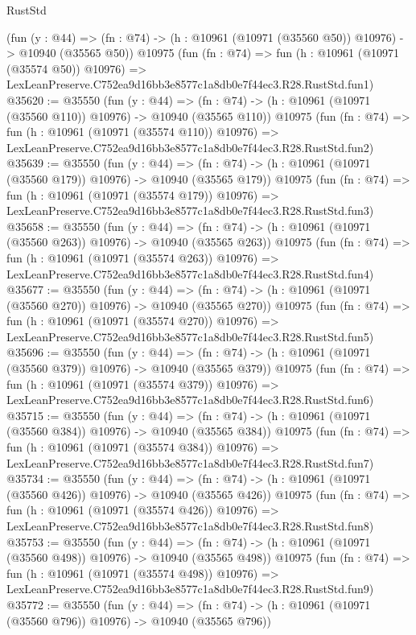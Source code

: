 \begin{lexlean}{RustStd}
\begin{coremodule}
    (fun (y : @44) =>
    (fn : @74) -> (h : @10961 (@10971 (@35560 @50)) @10976) -> @10940 (@35565 @50))
    @10975
    (fun (fn : @74) =>
    fun (h : @10961 (@10971 (@35574 @50)) @10976) =>
    LexLeanPreserve.C752ea9d16bb3e8577c1a8db0e7f44ec3.R28.RustStd.fun1)
@35620 := @35550
    (fun (y : @44) =>
    (fn : @74) -> (h : @10961 (@10971 (@35560 @110)) @10976) -> @10940 (@35565 @110))
    @10975
    (fun (fn : @74) =>
    fun (h : @10961 (@10971 (@35574 @110)) @10976) =>
    LexLeanPreserve.C752ea9d16bb3e8577c1a8db0e7f44ec3.R28.RustStd.fun2)
@35639 := @35550
    (fun (y : @44) =>
    (fn : @74) -> (h : @10961 (@10971 (@35560 @179)) @10976) -> @10940 (@35565 @179))
    @10975
    (fun (fn : @74) =>
    fun (h : @10961 (@10971 (@35574 @179)) @10976) =>
    LexLeanPreserve.C752ea9d16bb3e8577c1a8db0e7f44ec3.R28.RustStd.fun3)
@35658 := @35550
    (fun (y : @44) =>
    (fn : @74) -> (h : @10961 (@10971 (@35560 @263)) @10976) -> @10940 (@35565 @263))
    @10975
    (fun (fn : @74) =>
    fun (h : @10961 (@10971 (@35574 @263)) @10976) =>
    LexLeanPreserve.C752ea9d16bb3e8577c1a8db0e7f44ec3.R28.RustStd.fun4)
@35677 := @35550
    (fun (y : @44) =>
    (fn : @74) -> (h : @10961 (@10971 (@35560 @270)) @10976) -> @10940 (@35565 @270))
    @10975
    (fun (fn : @74) =>
    fun (h : @10961 (@10971 (@35574 @270)) @10976) =>
    LexLeanPreserve.C752ea9d16bb3e8577c1a8db0e7f44ec3.R28.RustStd.fun5)
@35696 := @35550
    (fun (y : @44) =>
    (fn : @74) -> (h : @10961 (@10971 (@35560 @379)) @10976) -> @10940 (@35565 @379))
    @10975
    (fun (fn : @74) =>
    fun (h : @10961 (@10971 (@35574 @379)) @10976) =>
    LexLeanPreserve.C752ea9d16bb3e8577c1a8db0e7f44ec3.R28.RustStd.fun6)
@35715 := @35550
    (fun (y : @44) =>
    (fn : @74) -> (h : @10961 (@10971 (@35560 @384)) @10976) -> @10940 (@35565 @384))
    @10975
    (fun (fn : @74) =>
    fun (h : @10961 (@10971 (@35574 @384)) @10976) =>
    LexLeanPreserve.C752ea9d16bb3e8577c1a8db0e7f44ec3.R28.RustStd.fun7)
@35734 := @35550
    (fun (y : @44) =>
    (fn : @74) -> (h : @10961 (@10971 (@35560 @426)) @10976) -> @10940 (@35565 @426))
    @10975
    (fun (fn : @74) =>
    fun (h : @10961 (@10971 (@35574 @426)) @10976) =>
    LexLeanPreserve.C752ea9d16bb3e8577c1a8db0e7f44ec3.R28.RustStd.fun8)
@35753 := @35550
    (fun (y : @44) =>
    (fn : @74) -> (h : @10961 (@10971 (@35560 @498)) @10976) -> @10940 (@35565 @498))
    @10975
    (fun (fn : @74) =>
    fun (h : @10961 (@10971 (@35574 @498)) @10976) =>
    LexLeanPreserve.C752ea9d16bb3e8577c1a8db0e7f44ec3.R28.RustStd.fun9)
@35772 := @35550
    (fun (y : @44) =>
    (fn : @74) -> (h : @10961 (@10971 (@35560 @796)) @10976) -> @10940 (@35565 @796))

\end{coremodule}
\end{lexlean}
